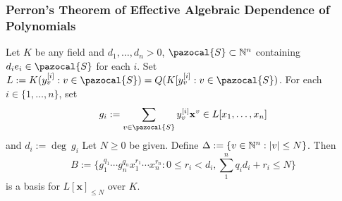 \subsubsection{Perron's Theorem of Effective Algebraic Dependence of Polynomials}
    \begin{lemma}\label{Satz58}
        Let $K$ be any field and $d_1,\dots,d_n>0$, $\pazocal{S}\subset \N^n$ containing $d_ie_i\in \pazocal{S}$ for each $i$. Set $L := K(y_v^{[i]} : v\in \pazocal{S})= Q(K[y_v^{[i]} : v \in \pazocal{S})$. For each $i\in \{1,\dots,n\}$, set 
        $$g_i := \sum_{v\in\pazocal{S}} y_v^{[i]}\mathbf{x}^v \in L[x_1,\dots,x_n]$$
        and $d_i := \deg\ g_i$
        Let $N\geq 0$ be given. Define $\Delta := \{ v\in \mathbb{N}^n : \vert v\vert \leq N\}$. Then 
        $$B := \{ g_1^{q_1}\cdots g_n^{q_n}x_1^{r_1}\cdots x_n^{r_n} : 0\leq r_i<d_i, \sum_1^n q_id_i+r_i \leq N\}$$
        is a basis for $L[\mathbf{x}]_{\leq N}$ over $K$.
    \end{lemma}
